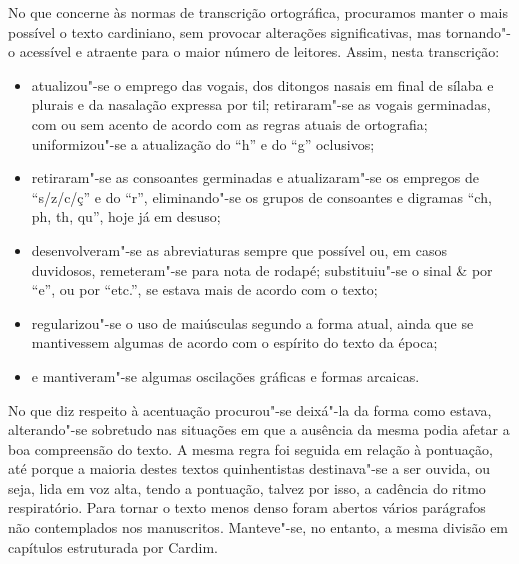  No que concerne às normas de transcrição ortográfica, procuramos
manter o mais possível o texto cardiniano, sem provocar alterações
significativas, mas tornando"-o acessível e atraente para o maior
número de leitores. Assim, nesta transcrição:

\begin{itemize}
\item atualizou"-se o emprego das vogais, dos ditongos nasais em final de
sílaba e plurais e da nasalação expressa por til; retiraram"-se as vogais
germinadas, com ou sem acento de acordo com as regras atuais de
ortografia; uniformizou"-se a atualização do ``h'' e do ``g'' oclusivos;

\item retiraram"-se as consoantes germinadas e atualizaram"-se os empregos de
``s/z/c/ç'' e do ``r'', eliminando"-se os grupos de consoantes e digramas
``ch, ph, th, qu'', hoje já em desuso;

\item desenvolveram"-se as abreviaturas sempre que possível ou, em casos
duvidosos, remeteram"-se para nota de rodapé; substituiu"-se o sinal \& por
``e'', ou por ``etc.'', se estava mais de acordo com o texto;

\item regularizou"-se o uso de maiúsculas segundo a forma atual, ainda
que se mantivessem algumas de acordo com o espírito do texto da época;

\item e mantiveram"-se algumas oscilações gráficas e formas arcaicas.
\end{itemize}

 No que diz respeito à acentuação procurou"-se deixá"-la da forma como
estava, alterando"-se sobretudo nas situações em que a ausência da mesma
podia afetar a boa compreensão do texto. A mesma regra foi seguida em
relação à pontuação, até porque a maioria destes textos quinhentistas
destinava"-se a ser ouvida, ou seja, lida em voz alta, tendo a
pontuação, talvez por isso, a cadência do ritmo respiratório. Para
tornar o texto menos denso foram abertos vários parágrafos não
contemplados nos manuscritos. Manteve"-se, no entanto, a mesma
divisão em capítulos estruturada por Cardim.

